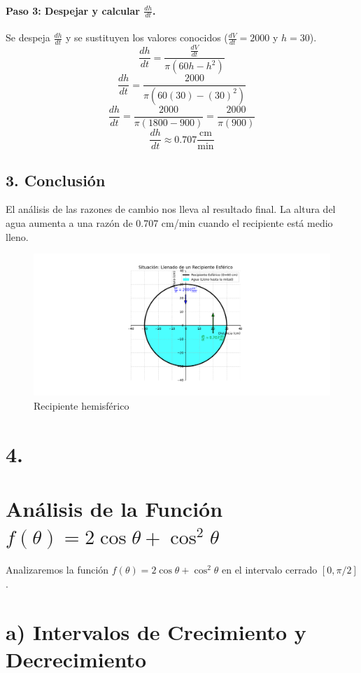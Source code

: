 \documentclass[12pt, letterpaper]{article}
\begin{document}
\paragraph{Paso 3: Despejar y calcular $\frac{dh}{dt}$.}
Se despeja $\frac{dh}{dt}$ y se sustituyen los valores conocidos ($\frac{dV}{dt} = 2000$ y $h = 30$).
$$\frac{dh}{dt} = \frac{\frac{dV}{dt}}{\pi(60h - h^2)}$$
$$\frac{dh}{dt} = \frac{2000}{\pi(60(30) - (30)^2)}$$
$$\frac{dh}{dt} = \frac{2000}{\pi(1800 - 900)} = \frac{2000}{\pi(900)}$$
$$\frac{dh}{dt} \approx 0.707 \frac{\text{cm}}{\text{min}}$$

\subsection*{3. Conclusión}
El análisis de las razones de cambio nos lleva al resultado final. La altura del agua aumenta a una razón de 0.707 cm/min cuando el recipiente está medio lleno.
\vspace{1cm}

\begin{figure}[h!]
    \centering
    \includegraphics[width=1.2\textwidth]{Figure_3.png}
    \caption{Recipiente hemisférico}
    \label{fig:Figure_2}
\end{figure}
\section*{4.}
\section*{Análisis de la Función $f(\theta) = 2\cos\theta + \cos^2\theta$}
Analizaremos la función $f(\theta) = 2\cos\theta + \cos^2\theta$ en el intervalo cerrado $[0, \pi/2]$.

\section*{a) Intervalos de Crecimiento y Decrecimiento}
\end{document}
